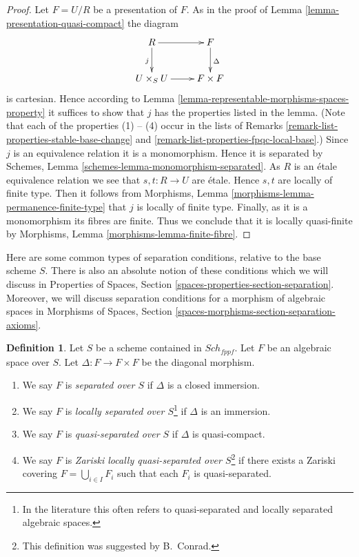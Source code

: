 \documentclass{stacks-project}
\theoremstyle{plain}
\theoremstyle{definition}
\newtheorem{definition}[subsection]{Definition}
\theoremstyle{remark}
\numberwithin{equation}{subsection}
\def\Sch{\mathit{Sch}}
\begin{document}
\begin{proof}
Let $F = U/R$ be a presentation of $F$.
As in the proof of Lemma \ref{lemma-presentation-quasi-compact} the diagram
$$
\xymatrix{
R \ar[r] \ar[d]_j & F \ar[d]^\Delta \\
U \times_S U \ar[r] & F \times F
}
$$
is cartesian. Hence according to
Lemma \ref{lemma-representable-morphisms-spaces-property}
it suffices to show that $j$ has the properties listed in the lemma.
(Note that each of the properties (1) -- (4) occur in the lists
of Remarks \ref{remark-list-properties-stable-base-change}
and \ref{remark-list-properties-fpqc-local-base}.)
Since $j$ is an equivalence relation it is a monomorphism.
Hence it is separated by
Schemes, Lemma \ref{schemes-lemma-monomorphism-separated}.
As $R$ is an \'etale equivalence relation we see that
$s, t : R \to U$ are \'etale. Hence $s, t$ are locally of finite
type. Then it follows from
Morphisms, Lemma \ref{morphisms-lemma-permanence-finite-type} that
$j$ is locally of finite type. Finally, as it is a monomorphism
its fibres are finite. Thus we conclude that it is locally quasi-finite by
Morphisms, Lemma \ref{morphisms-lemma-finite-fibre}.
\end{proof}

\noindent
Here are some common types of separation conditions, relative to the base
scheme $S$. There is also an absolute notion of these conditions which we
will discuss in
Properties of Spaces, Section \ref{spaces-properties-section-separation}.
Moreover, we will discuss separation conditions for a morphism of
algebraic spaces in
Morphisms of Spaces, Section \ref{spaces-morphisms-section-separation-axioms}.

\begin{definition}
\label{definition-separated}
Let $S$ be a scheme contained in $\Sch_{fppf}$.
Let $F$ be an algebraic space over $S$.
Let $\Delta : F \to F \times F$ be the diagonal morphism.
\begin{enumerate}
\item We say $F$ is {\it separated over $S$} if $\Delta$ is a closed immersion.
\item We say $F$ is {\it locally separated over $S$}\footnote{In the
literature this often refers to quasi-separated and
locally separated algebraic spaces.} if $\Delta$ is an
immersion.
\item We say $F$ is {\it quasi-separated over $S$} if $\Delta$ is quasi-compact.
\item We say $F$ is {\it Zariski locally quasi-separated over $S$}\footnote{This
definition was suggested by B.\ Conrad.} if there
exists a Zariski covering $F = \bigcup_{i \in I} F_i$ such that
each $F_i$ is quasi-separated.
\end{enumerate}
\end{definition}
\end{document}
